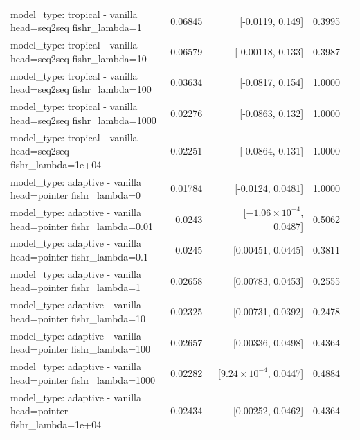 \documentclass[10pt]{article}
\makeatletter
\newcommand{\stackcell}[1]{\begin{tabular}[t]{@{}l@{}}#1\end{tabular}}
\makeatother
\begin{document}
{\begin{longtable}{lrrrl}
\stackcell{model\_type: tropical - vanilla\\\footnotesize head=seq2seq fishr\_lambda=1 } & 0.06845 & [-0.0119, 0.149] & 0.3995 & \\
\stackcell{model\_type: tropical - vanilla\\\footnotesize head=seq2seq fishr\_lambda=10 } & 0.06579 & [-0.00118, 0.133] & 0.3987 & \\
\stackcell{model\_type: tropical - vanilla\\\footnotesize head=seq2seq fishr\_lambda=100 } & 0.03634 & [-0.0817, 0.154] & 1.0000 & \\
\stackcell{model\_type: tropical - vanilla\\\footnotesize head=seq2seq fishr\_lambda=1000 } & 0.02276 & [-0.0863, 0.132] & 1.0000 & \\
\stackcell{model\_type: tropical - vanilla\\\footnotesize head=seq2seq fishr\_lambda=1e+04 } & 0.02251 & [-0.0864, 0.131] & 1.0000 & \\
\stackcell{model\_type: adaptive - vanilla\\\footnotesize head=pointer fishr\_lambda=0 } & 0.01784 & [-0.0124, 0.0481] & 1.0000 & \\
\stackcell{model\_type: adaptive - vanilla\\\footnotesize head=pointer fishr\_lambda=0.01 } & 0.0243 & [$-1.06\times10^{-4}$, 0.0487] & 0.5062 & \\
\stackcell{model\_type: adaptive - vanilla\\\footnotesize head=pointer fishr\_lambda=0.1 } & 0.0245 & [0.00451, 0.0445] & 0.3811 & \\
\stackcell{model\_type: adaptive - vanilla\\\footnotesize head=pointer fishr\_lambda=1 } & 0.02658 & [0.00783, 0.0453] & 0.2555 & \\
\stackcell{model\_type: adaptive - vanilla\\\footnotesize head=pointer fishr\_lambda=10 } & 0.02325 & [0.00731, 0.0392] & 0.2478 & \\
\stackcell{model\_type: adaptive - vanilla\\\footnotesize head=pointer fishr\_lambda=100 } & 0.02657 & [0.00336, 0.0498] & 0.4364 & \\
\stackcell{model\_type: adaptive - vanilla\\\footnotesize head=pointer fishr\_lambda=1000 } & 0.02282 & [$9.24\times10^{-4}$, 0.0447] & 0.4884 & \\
\stackcell{model\_type: adaptive - vanilla\\\footnotesize head=pointer fishr\_lambda=1e+04 } & 0.02434 & [0.00252, 0.0462] & 0.4364 & \\

\end{longtable}}
\end{document}
